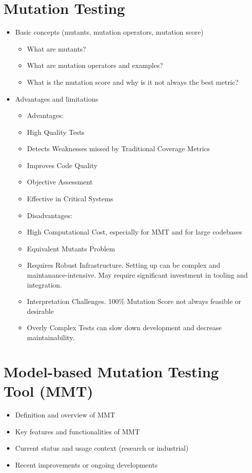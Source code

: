\documentclass[sigplan, nonacm]{acmart}
\begin{document}
\section{Mutation Testing}
\begin{itemize}
    \item Basic concepts (mutants, mutation operators, mutation score)
        \begin{itemize}
            \item What are mutants?
            \item What are mutation operators and examples?
            \item What is the mutation score and why is it not always the best metric?
        \end{itemize}
    \item Advantages and limitations
        \begin{itemize}
            \item Advantages:
            \item High Quality Tests
            \item Detects Weaknesses missed by Traditional Coverage Metrics
            \item Improves Code Quality
            \item Objective Assessment
            \item Effective in Critical Systems
            \item Disadvantages:
            \item High Computational Cost, especially for MMT and for large codebases
            \item Equivalent Mutants Problem
            \item Requires Robust Infrastructure. Setting up can be complex and maintanance-intensive. May require significant investment in tooling and integration.
            \item Interpretation Challenges. 100\% Mutation Score not always feasible or desirable
            \item Overly Complex Tests can slow down development and decrease maintainability.
        \end{itemize}
\end{itemize}

\section{Model-based Mutation Testing Tool (MMT)}
\begin{itemize}
    \item Definition and overview of MMT
    \item Key features and functionalities of MMT
    \item Current status and usage context (research or industrial)
    \item Recent improvements or ongoing developments
\end{itemize}
\end{document}
